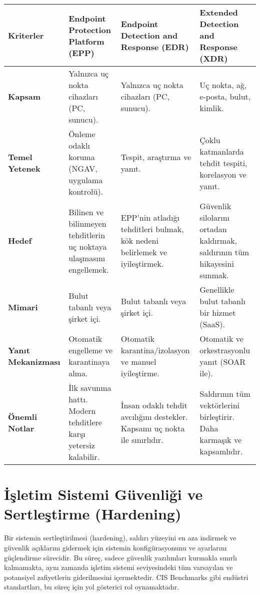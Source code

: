 \begin{longtable}{|p{4cm}|p{4cm}|p{4cm}|p{4cm}|}
\hline
\textbf{Kriterler} & \textbf{Endpoint Protection Platform (EPP)} & \textbf{Endpoint Detection and Response (EDR)} & \textbf{Extended Detection and Response (XDR)} \\
\hline
\textbf{Kapsam} & Yalnızca uç nokta cihazları (PC, sunucu). & Yalnızca uç nokta cihazları (PC, sunucu). & Uç nokta, ağ, e-posta, bulut, kimlik. \\
\hline
\textbf{Temel Yetenek} & Önleme odaklı koruma (NGAV, uygulama kontrolü). & Tespit, araştırma ve yanıt. & Çoklu katmanlarda tehdit tespiti, korelasyon ve yanıt. \\
\hline
\textbf{Hedef} & Bilinen ve bilinmeyen tehditlerin uç noktaya ulaşmasını engellemek. & EPP'nin atladığı tehditleri bulmak, kök nedeni belirlemek ve iyileştirmek. & Güvenlik silolarını ortadan kaldırmak, saldırının tüm hikayesini sunmak. \\
\hline
\textbf{Mimari} & Bulut tabanlı veya şirket içi. & Bulut tabanlı veya şirket içi. & Genellikle bulut tabanlı bir hizmet (SaaS). \\
\hline
\textbf{Yanıt Mekanizması} & Otomatik engelleme ve karantinaya alma. & Otomatik karantina/izolasyon ve manuel iyileştirme. & Otomatik ve orkestrasyonlu yanıt (SOAR ile). \\
\hline
\textbf{Önemli Notlar} & İlk savunma hattı. Modern tehditlere karşı yetersiz kalabilir. & İnsan odaklı tehdit avcılığını destekler. Kapsamı uç nokta ile sınırlıdır. & Saldırının tüm vektörlerini birleştirir. Daha karmaşık ve kapsamlıdır. \\
\hline
\end{longtable}

\section{İşletim Sistemi Güvenliği ve Sertleştirme (Hardening)}

Bir sistemin sertleştirilmesi (hardening), saldırı yüzeyini en aza indirmek ve güvenlik açıklarını gidermek için sistemin konfigürasyonunu ve ayarlarını güçlendirme sürecidir. Bu süreç, sadece güvenlik yazılımları kurmakla sınırlı kalmamakta, aynı zamanda işletim sistemi seviyesindeki tüm varsayılan ve potansiyel zafiyetlerin giderilmesini içermektedir. CIS Benchmarks gibi endüstri standartları, bu süreç için yol gösterici rol oynamaktadır.

